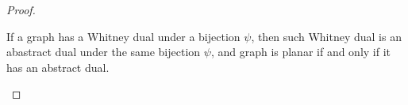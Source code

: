\begin{proof}
\begin{enumerate}[label=(\roman*)]
                If a graph has a Whitney dual under a bijection $\psi$, then such Whitney dual is an abastract dual under the
                same bijection $\psi$, and graph is planar if and only if it has an abstract dual.\pn
    \end{enumerate}
\end{proof}

